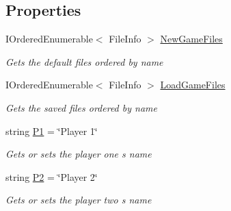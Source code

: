 \subsection*{Properties}
\begin{DoxyCompactItemize}
\item 
I\+Ordered\+Enumerable$<$ File\+Info $>$ \mbox{\hyperlink{class_bomberman_1_1_u_i_1_1_view_models_1_1_level_select_view_model_a08d69535daeb16cb4360dcd8adb11ed4}{New\+Game\+Files}}
\begin{DoxyCompactList}\small\item\em Gets the default files ordered by name \end{DoxyCompactList}\item 
I\+Ordered\+Enumerable$<$ File\+Info $>$ \mbox{\hyperlink{class_bomberman_1_1_u_i_1_1_view_models_1_1_level_select_view_model_acbbf1a8ae6d24c858f979e86145655ef}{Load\+Game\+Files}}
\begin{DoxyCompactList}\small\item\em Gets the saved files ordered by name \end{DoxyCompactList}\item 
string \mbox{\hyperlink{class_bomberman_1_1_u_i_1_1_view_models_1_1_level_select_view_model_aaf7c009d1c89755568c28bd577a00774}{P1}} = \char`\"{}Player 1\char`\"{}
\begin{DoxyCompactList}\small\item\em Gets or sets the player one s name \end{DoxyCompactList}\item 
string \mbox{\hyperlink{class_bomberman_1_1_u_i_1_1_view_models_1_1_level_select_view_model_a49af0fc46e0b68c371385ff0f998ed45}{P2}} = \char`\"{}Player 2\char`\"{}
\begin{DoxyCompactList}\small\item\em Gets or sets the player two s name \end{DoxyCompactList}\end{DoxyCompactItemize}
